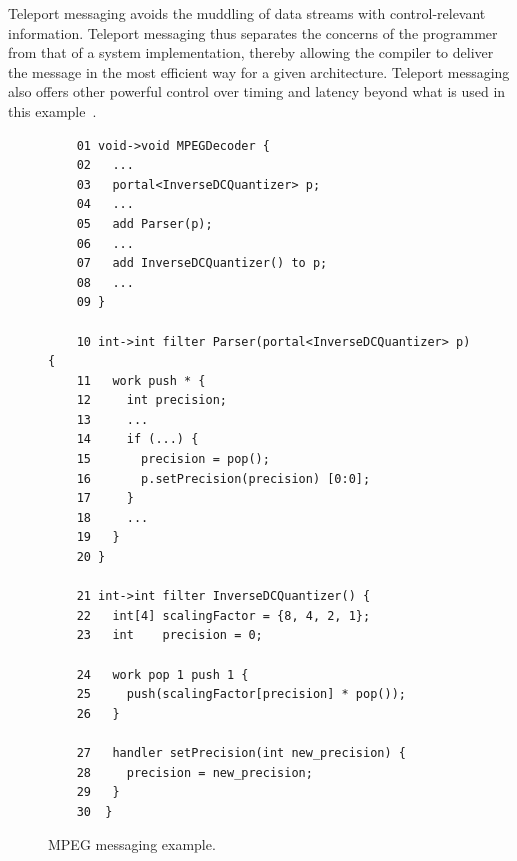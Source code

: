Teleport messaging avoids the muddling of data streams with
control-relevant information. Teleport messaging thus separates the
concerns of the programmer from that of a system implementation,
thereby allowing the compiler to deliver the message in the most
efficient way for a given architecture. Teleport messaging also offers
other powerful control over timing and latency beyond what is used in
this example~\cite{thies05ppopp}.


\begin{figure}[t]
  \begin{scriptsize}
    \begin{verbatim}
	01 void->void MPEGDecoder {
	02   ...
	03   portal<InverseDCQuantizer> p;
	04   ...
	05   add Parser(p);
	06   ...
	07   add InverseDCQuantizer() to p;
	08   ...
	09 }

	10 int->int filter Parser(portal<InverseDCQuantizer> p) {
	11   work push * {
	12     int precision;
	13     ...
	14     if (...) {
	15       precision = pop();
	16       p.setPrecision(precision) [0:0];
	17     }
	18     ...
	19   }
	20 }

	21 int->int filter InverseDCQuantizer() {
	22   int[4] scalingFactor = {8, 4, 2, 1};
	23   int    precision = 0;

	24   work pop 1 push 1 {
	25     push(scalingFactor[precision] * pop());
	26   }

	27   handler setPrecision(int new_precision) {
	28     precision = new_precision;
	29   }
	30  }
    \end{verbatim}
  \end{scriptsize}
  \caption{MPEG messaging example.}
  \label{fig:messaging}
\end{figure}
